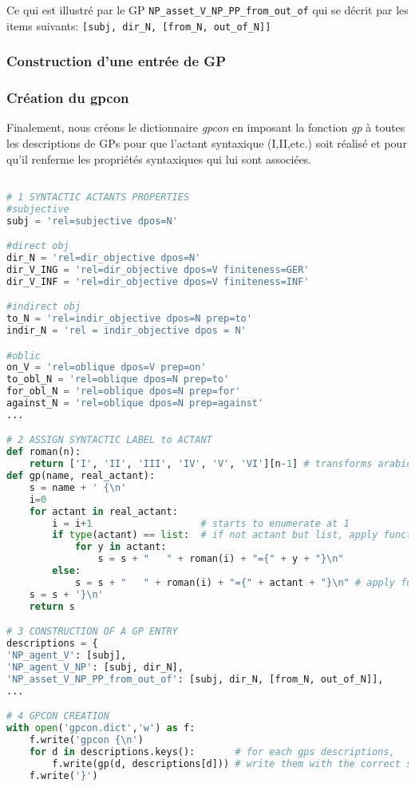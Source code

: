 Ce qui est illustré par le \ac{GP} \lstinline|NP_asset_V_NP_PP_from_out_of| qui se décrit par les items suivants: \lstinline|[subj, dir_N, [from_N, out_of_N]]|

\subsubsection{Construction d'une entrée de \ac{GP}}


\subsubsection{Création du gpcon}
Finalement, nous créons le dictionnaire \emph{gpcon} en imposant la fonction \emph{gp} à toutes les descriptions de \acp{GP} pour que l'actant syntaxique (I,II,etc.) soit réalisé et pour qu'il renferme les propriétés syntaxiques qui lui sont associées.

\begin{lstlisting}[language=Python, caption = code pour gpcon.dict]

# 1 SYNTACTIC ACTANTS PROPERTIES
#subjective
subj = 'rel=subjective dpos=N'

#direct obj
dir_N = 'rel=dir_objective dpos=N'
dir_V_ING = 'rel=dir_objective dpos=V finiteness=GER'
dir_V_INF = 'rel=dir_objective dpos=V finiteness=INF'

#indirect obj
to_N = 'rel=indir_objective dpos=N prep=to'
indir_N = 'rel = indir_objective dpos = N'

#oblic
on_V = 'rel=oblique dpos=V prep=on'
to_obl_N = 'rel=oblique dpos=N prep=to' 
for_obl_N = 'rel=oblique dpos=N prep=for'
against_N = 'rel=oblique dpos=N prep=against'
...

# 2 ASSIGN SYNTACTIC LABEL to ACTANT
def roman(n):
    return ['I', 'II', 'III', 'IV', 'V', 'VI'][n-1] # transforms arabic numbers in roman numbers
def gp(name, real_actant):
    s = name + ' {\n'
    i=0
    for actant in real_actant:
        i = i+1                   # starts to enumerate at 1
        if type(actant) == list:  # if not actant but list, apply function to actants in list
            for y in actant:
                s = s + "   " + roman(i) + "={" + y + "}\n"
        else:
            s = s + "   " + roman(i) + "={" + actant + "}\n" # apply function to actant
    s = s + '}\n'
    return s 

# 3 CONSTRUCTION OF A GP ENTRY
descriptions = {
'NP_agent_V': [subj],
'NP_agent_V_NP': [subj, dir_N],
'NP_asset_V_NP_PP_from_out_of': [subj, dir_N, [from_N, out_of_N]],
...

# 4 GPCON CREATION
with open('gpcon.dict','w') as f: 
    f.write('gpcon {\n')
    for d in descriptions.keys():       # for each gps descriptions,
        f.write(gp(d, descriptions[d])) # write them with the correct syntactic label
    f.write('}')
\end{lstlisting}

